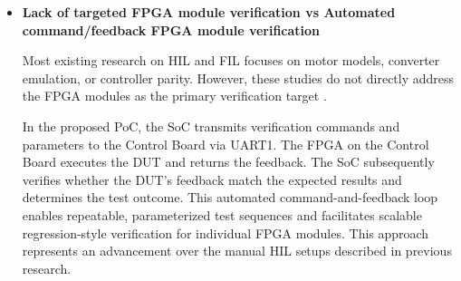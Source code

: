 \begin{itemize}
	\item \textbf{Lack of targeted \acs{FPGA} module verification vs Automated command/feedback \acs{FPGA} module verification}
	
	Most existing research on \acs{HIL} and \acs{FIL} focuses on motor models, converter emulation, or controller parity. However, these studies do not directly address the \acs{FPGA} modules as the primary verification target\cite{Debreceni2014_MiniSolarHIL_LiteratureSurvey} .
	
	In the proposed \acs{PoC}, the \acs{SoC} transmits verification commands and parameters to the Control Board via UART1. The \acs{FPGA} on the Control Board executes the \acs{DUT} and returns the feedback. The \acs{SoC} subsequently verifies whether the \acs{DUT}'s feedback match the expected results and determines the test outcome. This automated command-and-feedback loop enables repeatable, parameterized test sequences and facilitates scalable regression-style verification for individual \acs{FPGA} modules. This approach represents an advancement over the manual \acs{HIL} setups described in previous research.

\end{itemize}


